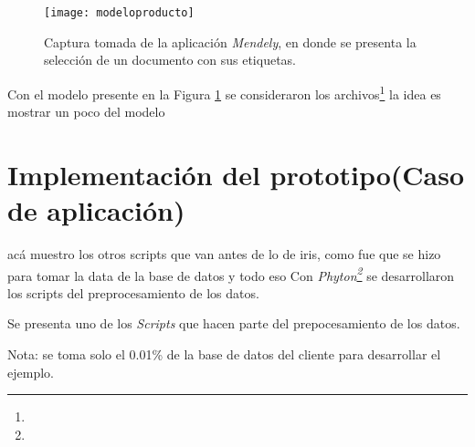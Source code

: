     \begin{figure}[h]
  	\centering
  	\texttt{[image: modeloproducto]}
  	\caption{Captura tomada de la aplicación \textit{Mendely}, en donde se presenta la selección de un documento con sus etiquetas.}
  	\label{modeloproducto}
  \end{figure}

Con el modelo presente en la Figura \ref{modeloproducto} se consideraron los archivos\footnote{ } la idea es mostrar un poco del modelo 
  \section{Implementación del prototipo(Caso de aplicación)}
  acá muestro los otros scripts que van antes de lo de iris, como fue que se hizo para tomar la data de la base de datos y todo eso
  Con \textit{Phyton\footnote{  }} se desarrollaron los scripts del preprocesamiento de los datos.
  
  
  
  
  
  Se presenta uno de los \textit{Scripts} que hacen parte del prepocesamiento de los datos.
  
 
  
  
 


Nota: se toma solo el 0.01\% de la base de datos del cliente para desarrollar el ejemplo. 
